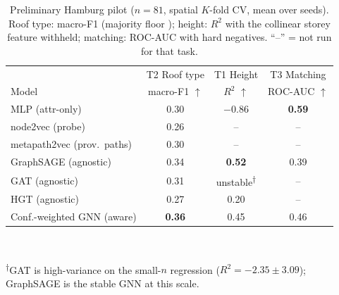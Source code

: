 \begin{table}[t]
  \centering
  \caption{Preliminary Hamburg pilot ($n{=}81$, spatial $K$-fold CV, mean over
   seeds). Roof type: macro-F1 (majority floor ); height:
  $R^2$ with the collinear storey feature withheld; matching: ROC-AUC with hard
  negatives. ``--'' = not run for that task.}
  \label{tab:repL-pilot}
  \small\setlength{\tabcolsep}{5pt}
  \begin{tabular}{@{}lccc@{}}
    \toprule
    & T2 Roof type & T1 Height & T3 Matching\\
    Model & macro-F1 $\uparrow$ & $R^2$ $\uparrow$ & ROC-AUC $\uparrow$\\
    \midrule
    MLP (attr-only)             & 0.30 & $-0.86$ & \textbf{0.59}\\
    node2vec (probe)            & 0.26 & --      & --\\
    metapath2vec (prov.\ paths) & 0.30 & --      & --\\
    \midrule
    GraphSAGE (agnostic)        & 0.34 & \textbf{0.52} & 0.39\\
    GAT (agnostic)              & 0.31 & unstable\textsuperscript{$\dagger$} & --\\
    HGT (agnostic)              & 0.27 & 0.20 & --\\
    Conf.-weighted GNN (aware)  & \textbf{0.36} & 0.45 & 0.46\\
    \bottomrule
  \end{tabular}\\[2pt]
  {\footnotesize\raggedright\textsuperscript{$\dagger$}GAT is high-variance on
  the small-$n$ regression ($R^2{=}-2.35\pm3.09$); GraphSAGE is the stable GNN
  at this scale.\par}
\end{table}

